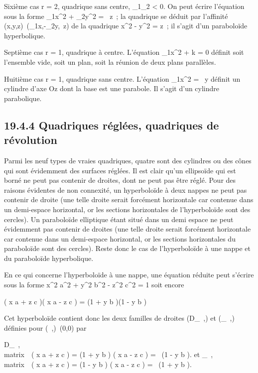 \documentclass[]{article}
\begin{document}
Sixième cas r = 2, quadrique sans centre, \lambda_1\lambda_2
< 0. On peut écrire l'équation sous la forme
\lambda_1x^2 + \lambda_2y^2 = \beta~z~; la
quadrique se déduit par l'affinité
(x,y,z)\mapsto~(\sqrt\lambda_1x,\sqrt-\lambda_2y,\beta~z)
de la quadrique x^2 - y^2 = z~; il s'agit d'un
paraboloïde hyperbolique.

Septième cas r = 1, quadrique à centre. L'équation
\lambda_1x^2 + k = 0 définit soit l'ensemble vide, soit un
plan, soit la réunion de deux plans parallèles.

Huitième cas r = 1, quadrique sans centre. L'équation
\lambda_1x^2 = \beta~y définit un cylindre d'axe Oz dont la
base est une parabole. Il s'agit d'un cylindre parabolique.

\subsection{19.4.4 Quadriques réglées, quadriques de révolution}

Parmi les neuf types de vraies quadriques, quatre sont des cylindres ou
des cônes qui sont évidemment des surfaces réglées. Il est clair qu'un
ellipsoïde qui est borné ne peut pas contenir de droites, dont ne peut
pas être réglé. Pour des raisons évidentes de non connexité, un
hyperboloïde à deux nappes ne peut pas contenir de droite (une telle
droite serait forcément horizontale car contenue dans un demi-espace
horizontal, or les sections horizontales de l'hyperboloïde sont des
cercles). Un paraboloïde elliptique étant situé dans un demi espace ne
peut évidemment pas contenir de droites (une telle droite serait
forcément horizontale car contenue dans un demi-espace horizontal, or
les sections horizontales du paraboloïde sont des cercles). Reste donc
le cas de l'hyperboloïde à une nappe et du paraboloïde hyperbolique.

En ce qui concerne l'hyperboloïde à une nappe, une équation réduite peut
s'écrire sous la forme  x^2 \over
a^2 + y^2 \over
b^2 - z^2 \over
c^2 = 1 soit encore

\left ( x \over a + z
\over c \right )\left (
x \over a - z \over c
\right ) = \left (1 + y
\over b \right )\left (1
- y \over b \right )

Cet hyperboloïde contient donc les deux familles de droites
(D_\lambda~,\mu) et (\Delta_\lambda~,\mu) définies pour
(\lambda~,\mu)\neq~(0,0) par

D_\lambda~,\mu \left
\\matrix\,\lambda~\left
( x \over a + z \over c
\right ) = \mu\left (1 + y
\over b \right ) \cr
\cr \mu\left ( x \over a
- z \over c \right ) =
\lambda~\left (1 - y \over b
\right )\right .\quad
\text et \quad \Delta_\lambda~,\mu
\left
\\matrix\,\lambda~\left
( x \over a + z \over c
\right ) = \mu\left (1 - y
\over b \right ) \cr
\cr \mu\left ( x \over a
- z \over c \right ) =
\lambda~\left (1 + y \over b
\right )\right .
\end{document}

